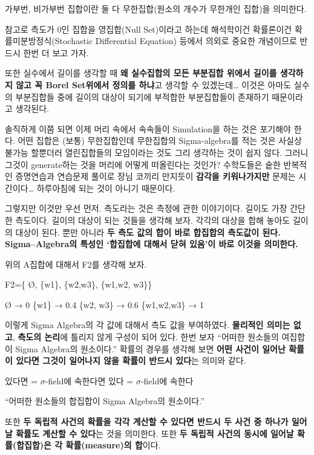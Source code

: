 \documentclass[
]{book}
\begin{document}
{{{가부번, 비가부번 집합이란 둘 다 무한집합(원소의 개수가 무한개인 집합)을 의미한다.

참고로 측도가 0인 집합을 영집합(Null Set)이라고 하는데 해석학이건 확률론이건 확률미분방정식(Stochastic Differential Equation) 등에서 의외로 중요한 개념이므로 반드시 한번 더 보고 가자.

또한 실수에서 길이를 생각할 때 \textbf{\textbf{왜} 실수집합의 \textbf{모든 부분집합} 위에서 길이를 생각하지 않고 꼭 Borel Set위에서 정의를 하냐}고 생각할 수 있겠는데\ldots{} 이것은 아마도 실수의 부분집합들 중에 길이의 대상이 되기에 부적합한 부분집합들이 존재하기 때문이라고 생각된다.

솔직하게 이쯤 되면 이제 머리 속에서 속속들이 Simulation을 하는 것은 포기해야 한다. 어떤 집합은 (보통) 무한집합인데 무한집합의 Sigma-algebra를 적는 것은 사실상 불가능 할뿐더러 열린집합들의 모임이라는 것도 그리 생각하는 것이 쉽지 않다. 그러니 그것이 generate하는 것을 머리에 어떻게 떠올린다는 것인가? 수학도들은 숱한 반복적인 증명연습과 연습문제 풀이로 장님 코끼리 만지듯이 \textbf{감각을 키워나가지만} 문제는 시간이다\ldots{} 하루아침에 되는 것이 아니기 때문이다.

그렇지만 이것만 우선 먼저. 측도라는 것은 측정에 관한 이야기이다. 길이도 가장 간단한 측도이다. 길이의 대상이 되는 것들을 생각해 보자. 각각의 대상을 합해 놓아도 길이의 대상이 된다. 뿐만 아니라 \textbf{두 측도 값의 합이 바로 합집합의 측도값이 된다. Sigma--Algebra의 특성인 `합집합에 대해서 닫혀 있음'이 바로 이것을 의미한다. }

위의 A집합에 대해서 F2를 생각해 보자.

F2=\{ Ø, \{w1\}, \{w2,w3\}, \{w1,w2, w3\}\}

Ø → 0
\{w1\} → 0.4
\{w2, w3\} → 0.6
\{w1,w2,w3\} → 1

이렇게 Sigma Algebra의 각 값에 대해서 측도 값을 부여하였다. \textbf{물리적인 의미는 없고}, \textbf{측도의 논리}에 틀리지 않게 구성이 되어 있다. 한번 보자 ``어떠한 원소들의 여집합이 Sigma Algebra의 원소이다.''
확률의 경우를 생각해 보면 \textbf{어떤 사건이 일어난 확률이 \textbf{있다면} 그것이 일어나지 않을 확률이 반드시 \textbf{있다}}는 의미와 같다.

있다면 = \(\sigma\)-field에 속한다면
있다 = \(\sigma\)-field에 속한다

``어떠한 원소들의 합집합이 Sigma Algebra의 원소이다.''

또한 \textbf{두 독립적 사건의 확률을 각각 계산할 수 있다면 반드시 두 사건 중 하나가 일어날 확률도 계산할 수 있다}는 것을 의미한다.
또한 \textbf{두 독립적 사건의 동시에 일어날 확률(합집합)은 각 확률(measure)의 합}이다.

}}}
\end{document}
